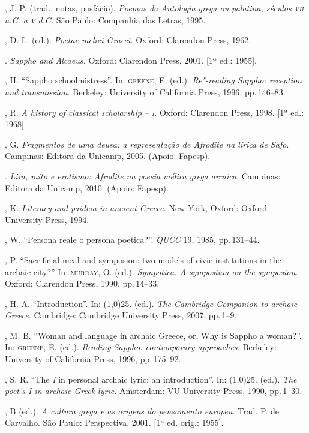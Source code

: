 \begin{bibliohedra}
, J. P. (trad., notas, posfácio). \textit{Poemas da Antologia grega
ou palatina, séculos \textsc{vii} a.C. a \textsc{v} d.C.} São Paulo: Companhia das Letras, 1995.

, D. L. (ed.). \textit{Poetae melici Graeci.} Oxford: Clarendon
Press, 1962.

\titidem. \textit{Sappho and Alcaeus.} Oxford: Clarendon
Press, 2001. {[}1ª ed.: 1955{]}.

, H. “Sappho schoolmistress”. In: \textsc{greene}, E. (ed.).
\textit{Re"-reading Sappho: reception and transmission.} Berkeley: University of
California Press, 1996, pp.\,146--83.

, R. \textit{A history of classical scholarship -- \textsc{i}.} Oxford:
Clarendon Press, 1998. {[}1ª ed.: 1968{]}

, G. \textit{Fragmentos de uma deusa: a representação de Afrodite
na lírica de Safo}. Campinas: Editora da Unicamp, 2005. (Apoio: Fapesp).

\titidem. \textit{Lira, mito e erotismo: Afrodite na poesia mélica grega
arcaica}. Campinas: Editora da Unicamp, 2010. (Apoio: Fapesp).

, K. \textit{Literacy and paideia in ancient Greece.} New York,
Oxford: Oxford University Press, 1994.

, W. “Persona reale o persona poetica?”. \textit{QUCC} 19, 1985,
pp.\,131--44.

, P. “Sacrificial meal and symposion: two models of
civic institutions in the archaic city?” In: \textsc{murray}, O. (ed.).
\textit{Sympotica. A symposium on the symposion.} Oxford: Clarendon Press,
1990, pp.\,14--33.

, H. A. “Introduction”. In: \line(1,0){25}.
(ed.). \textit{The Cambridge Companion to archaic Greece.} Cambridge: Cambridge
University Press, 2007, pp.\,1--9.

, M. B. “Woman and language in archaic Greece, or, Why is Sappho
a woman?”. In: \textsc{greene}, E. (ed.). \textit{Reading Sappho: contemporary
approaches.} Berkeley: University of California Press, 1996, pp.\,175--92.

, S. R. “The \textit{I} in personal archaic lyric: an
introduction”. In: \line(1,0){25}. (ed.). \textit{The poet’s I in archaic Greek
lyric.} Amsterdam: VU University Press, 1990, pp.\,1--30.

, B (ed.). \textit{A cultura grega e as origens do pensamento
europeu.} Trad. P. de Carvalho. São Paulo: Perspectiva, 2001. {[}1ª ed. orig.:
1955{]}.


\end{bibliohedra}
